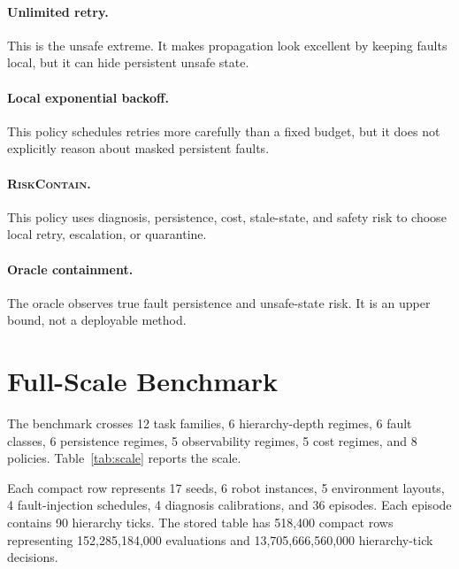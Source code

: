 \documentclass{article}
\newcommand{\method}{\textsc{RiskContain}\xspace}
\begin{document}
\paragraph{Unlimited retry.}
This is the unsafe extreme. It makes propagation look excellent by keeping faults local, but it can hide persistent unsafe state.

\paragraph{Local exponential backoff.}
This policy schedules retries more carefully than a fixed budget, but it does not explicitly reason about masked persistent faults.

\paragraph{\method.}
This policy uses diagnosis, persistence, cost, stale-state, and safety risk to choose local retry, escalation, or quarantine.

\paragraph{Oracle containment.}
The oracle observes true fault persistence and unsafe-state risk. It is an upper bound, not a deployable method.

\section{Full-Scale Benchmark}

The benchmark crosses 12 task families, 6 hierarchy-depth regimes, 6 fault classes, 6 persistence regimes, 5 observability regimes, 5 cost regimes, and 8 policies. Table~\ref{tab:scale} reports the scale.

\begin{table}[t]
\centering
\caption{Full-scale benchmark size. Compact rows summarize repeated seeds, robot instances, environment layouts, fault schedules, diagnosis calibrations, episodes, and hierarchy ticks.}
\label{tab:scale}

\end{table}

Each compact row represents 17 seeds, 6 robot instances, 5 environment layouts, 4 fault-injection schedules, 4 diagnosis calibrations, and 36 episodes. Each episode contains 90 hierarchy ticks. The stored table has 518,400 compact rows representing 152,285,184,000 evaluations and 13,705,666,560,000 hierarchy-tick decisions.
\end{document}
